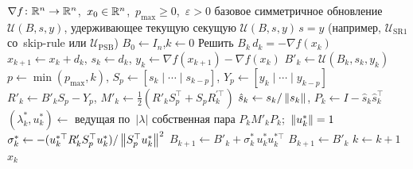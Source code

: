 \begin{breakablealgorithm}
\caption{SS-$\mathcal{U}$\ $(\nabla f,\,x_0,\,p_{\max},\,\varepsilon;\,\mathcal{U})$}
\label{alg:ss_u}
\begin{algorithmic}
\Require $\nabla f\colon\mathbb{R}^n\to\mathbb{R}^n$,\ $x_0\in\mathbb{R}^n$,\
         $p_{\max}\ge 0$,\ $\varepsilon>0$
\Require базовое симметричное обновление $\mathcal{U}(B,s,y)$, удерживающее
         текущую секущую $\mathcal{U}(B,s,y)\,s=y$ (например,
         $\mathcal{U}_{\mathrm{SR1}}$ со~skip-rule или $\mathcal{U}_{\mathrm{PSB}}$)
\State $B_0 \leftarrow I_n$,\quad $k \leftarrow 0$
  \State Решить $B_k\,d_k = -\nabla f(x_k)$
  \State $x_{k+1}\leftarrow x_k + d_k$,\quad
         $s_k\leftarrow d_k$,\quad
         $y_k\leftarrow \nabla f(x_{k+1})-\nabla f(x_k)$
  \State $B'_k \leftarrow \mathcal{U}(B_k, s_k, y_k)$
  \State $p \leftarrow \min(p_{\max},k)$,\quad
         $S_p\leftarrow [s_k\mid\cdots\mid s_{k-p}]$,\quad
         $Y_p\leftarrow [y_k\mid\cdots\mid y_{k-p}]$
  \State $R'_k \leftarrow B'_k S_p - Y_p$,\quad
         $M'_k \leftarrow \tfrac{1}{2}(R'_k S_p^{\top} + S_p R^{\prime\top}_k)$
  \State $\hat s_k\leftarrow s_k/\left\|s_k\right\|$,\quad
         $P_k \leftarrow I-\hat s_k\hat s_k^{\top}$
  \State $(\lambda_k^{*},u_k^{*}) \leftarrow$ ведущая по~$|\lambda|$ собственная пара
         $P_k M'_k P_k$;\ $\left\|u_k^{*}\right\|=1$
  \If{$u_k^{*}\ne 0$ \textbf{and} $S_p^{\top} u_k^{*}\ne 0$}
    \State $\sigma_k^{*}\leftarrow -(u_k^{*\top} R'_k S_p^{\top} u_k^{*})/\left\|S_p^{\top} u_k^{*}\right\|^2$
    \State $B_{k+1}\leftarrow B'_k + \sigma_k^{*}\,u_k^{*} u_k^{*\top}$
  \Else
    \State $B_{k+1}\leftarrow B'_k$
  \EndIf
  \State $k\leftarrow k+1$
\EndWhile
\Return $x_k$
\end{algorithmic}
\end{breakablealgorithm}

